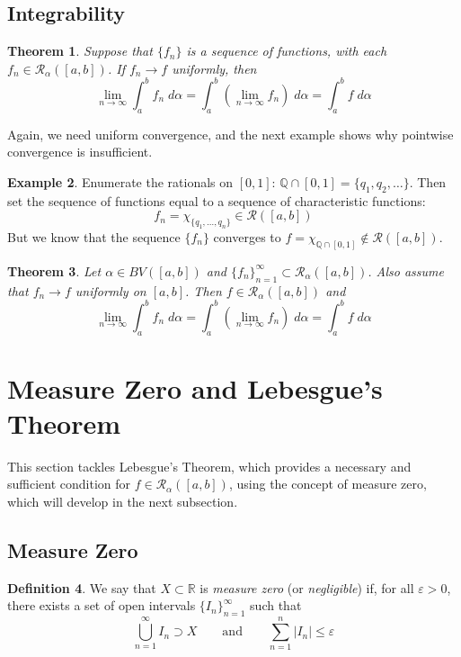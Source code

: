 \documentclass[12pt]{article}
\theoremstyle{plain}
\newtheorem{thm}{Theorem}[subsection]
\theoremstyle{definition}
\newtheorem{defn}[thm]{Definition}
\newtheorem{ex}[thm]{Example}
\theoremstyle{remark}
\begin{document}
\subsection{Integrability}

\begin{thm}
Suppose that $\{f_n\}$ is a sequence of functions, with each $f_n\in\mathscr{R}_\alpha([a,b])$. If $f_n\rightarrow f$ uniformly,
then 
\[ 
    \lim_{n\rightarrow\infty} \int^b_a f_n\;d\alpha
    = \int^b_a \left(\lim_{n\rightarrow\infty} f_n \right)\;
    d\alpha = \int^b_a f\;d\alpha
\]
\end{thm}

Again, we need uniform convergence, and the next example shows why pointwise convergence is insufficient.

\begin{ex}
    Enumerate the rationals on $[0,1]$: $\mathbb{Q}\cap[0,1] = \{q_1, q_2, \ldots\}$. Then set the sequence of functions equal to a sequence of characteristic functions:
\[ 
    f_n = \chi_{\{q_1, \ldots, q_n\}} \in \mathscr{R}([a,b])
\]
But we know that the sequence $\{f_n\}$ converges to $f=\chi_{\mathbb{Q}\cap [0,1]}\not\in\mathscr{R}([a,b])$.
\end{ex}

\begin{thm}
Let $\alpha\in BV([a,b])$ and $\{f_n\}_{n=1}^\infty\subset \mathscr{R}_\alpha([a,b])$. Also assume that $f_n\rightarrow f$ uniformly on $[a,b]$. Then $f\in\mathscr{R}_\alpha([a,b])$ and 
\[ 
    \lim_{n\rightarrow\infty} \int^b_a f_n\;d\alpha
    = \int^b_a \left(\lim_{n\rightarrow\infty} f_n \right)\;
    d\alpha = \int^b_a f\;d\alpha
\]

\end{thm}


\newpage
\section{Measure Zero and Lebesgue's Theorem}

This section tackles Lebesgue's Theorem, which provides a necessary and sufficient condition for $f\in\mathscr{R}_\alpha([a,b])$, using the concept of measure zero, which will develop in the next subsection.

\subsection{Measure Zero}

\begin{defn}
We say that $X\subset\mathbb{R}$ is \emph{measure zero} (or \emph{negligible}) if, for all $\varepsilon>0$, there exists a set of open intervals $\{I_n\}_{n=1}^\infty$ such that 
\[ 
    \bigcup^\infty_{n=1} I_n \supset X \qquad
    \text{and} \qquad \sum^n_{n=1} |I_n|\leq \varepsilon
\]
\end{defn}
\end{document}
